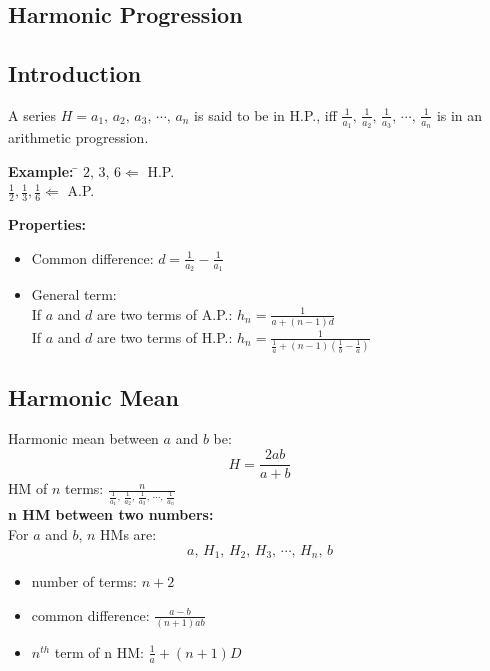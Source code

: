 \documentclass[11pt,a4paper,landscape]{article}
\begin{document}
\begin{multicols*}{3}
\section{Harmonic Progression}
	\subsection{Introduction}
	A series $H=a_1,\,a_2,\,a_3,\,\cdots,\,a_n$ is said to be in H.P., iff $\frac{1}{a_1},\,\frac{1}{a_2},\,\frac{1}{a_3},\,\cdots,\,\frac{1}{a_n}$ is in an arithmetic progression.\\
	\begin{tabbing}
	\textbf{\large{Example:}} \hspace{4mm} \= 	$2,\,3,\,6 \Leftarrow$ H.P.\\
	 \> $\frac{1}{2},\frac{1}{3},\frac{1}{6} \Leftarrow$ A.P.\\
	\end{tabbing}
	\textbf{\large{Properties:}}
	\begin{itemize}
	\item Common difference: $d = \frac{1}{a_2}-\frac{1}{a_1}$
	\item General term:\\
		If $a$ and $d$ are two terms of A.P.: $h_n=\frac{1}{a+(n-1)d}$\\
		If $a$ and $d$ are two terms of H.P.: $h_n=\frac{1}{\frac{1}{a}+(n-1)\left(\frac{1}{b}-\frac{1}{a}\right)}$
	\end{itemize}
	\subsection{Harmonic Mean}
	Harmonic mean between $a$ and $b$ be:
	$$H=\frac{2ab}{a+b}$$
	HM of $n$ terms: $\frac{n}{\frac{1}{a_1},\,\frac{1}{a_2},\,\frac{1}{a_3},\,\cdots,\,\frac{1}{a_n}}$\\
	\textbf{n HM between two numbers:}\\
	For $a$ and $b$, $n$ HMs are:
	$$a,\,H_1,\,H_2,\,H_3,\,\cdots,\,H_n,\,b$$
	\begin{itemize}
	\item number of terms: $n+2$
	\item common difference: $\frac{a-b}{(n+1)ab}$
	\item $n^{th}$ term of n HM: $\frac{1}{a}+(n+1)D$
	\end{itemize}

\end{multicols*}
\end{document}
